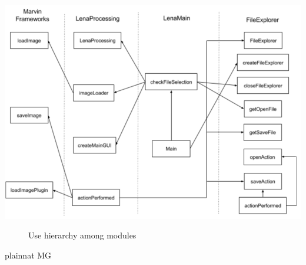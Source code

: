\documentclass[12pt, titlepage]{article}
\begin{document}
\includegraphics[width=\linewidth]{Uses.PNG}

\begin{figure}[H]
\centering
\caption{Use hierarchy among modules}
\label{FigUH}
\end{figure}


 {plainnat}
 {MG}
\end{document}
